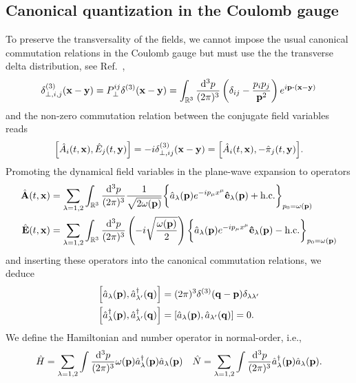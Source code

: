 \subsection{Canonical quantization in the Coulomb gauge}

To preserve the transversality of the fields, we cannot impose the usual canonical commutation relations in the Coulomb gauge but must use the the transverse delta distribution, see Ref.~\cite[p.~197]{Greiner2013},
\begin{equation}
	\delta_{\perp,i,j}^{(3)}(\vb{x}-\vb{y})
	=
	P^{ij}_\perp
	\delta^{(3)}(\vb{x}-\vb{y})
	=
	\int_{\mathbb{R}^3}
	\frac{\dd[3]{p}}{(2\pi)^3}
	\left(
		\delta_{ij}
		-
		\frac{p_ip_j}{\vb{p}^2}
	\right)
	e^{i\vb{p}\vdot(\vb{x}-\vb{y})}
\end{equation}
and the non-zero commutation relation between the conjugate field variables reads
\begin{equation}
	\comm{\hat{A}_i(t,\vb{x})}{\hat{E}_j(t,\vb{y})}
	=
	-i
	\delta_{\perp,ij}^{(3)}(\vb{x}-\vb{y})
	=
	\comm{\hat{A}_i(t,\vb{x})}{-\hat\pi_j(t,\vb{y})}
	.
\end{equation}
Promoting the dynamical field variables in the plane-wave expansion to operators
\begin{align}
	\hat{\vb{A}}(t,\vb{x})
	&=
	\sum_{\lambda=1,2}
	\int_{\mathbb{R}^3}
	\frac{\dd[3]{p}}{(2\pi)^3}
	\frac{1}{\sqrt{2\omega(\vb{p})}}
	\biggl\{
		\hat{a}_{\lambda}(\vb{p})
		e^{-ip_\mu x^\mu}
		\vu{e}_\lambda(\vb{p})
		+
		\text{h.c.}
	\biggr\}_{p_0=\omega(\vb{p})}
	\\
	\hat{\vb{E}}(t,\vb{x})
	&=
	\sum_{\lambda=1,2}
	\int_{\mathbb{R}^3}
	\frac{\dd[3]{p}}{(2\pi)^3}
	\left(
		-i
		\sqrt{\frac{\omega(\vb{p})}{2}}
	\right)
	\biggl\{
		\hat{a}_{\lambda}(\vb{p})
		e^{-ip_\mu x^\mu}
		\vu{e}_\lambda(\vb{p})
		-
		\text{h.c.}
	\biggr\}_{p_0=\omega(\vb{p})}
\end{align}
and inserting these operators into the canonical commutation relations, we deduce
\begin{align}
	\comm{\hat{a}_\lambda(\vb{p})}{\hat{a}_{\lambda^\prime}^\dagger(\vb{q})}
	&=
	(2\pi)^3
	\delta^{(3)}(\vb{q}-\vb{p})
	\delta_{\lambda\lambda^\prime}
	\\
	\comm{\hat{a}_\lambda^\dagger(\vb{p})}{\hat{a}_{\lambda^\prime}^\dagger(\vb{q})}
	&=
	\comm{\hat{a}_\lambda(\vb{p})}{\hat{a}_{\lambda^\prime}(\vb{q})}
	=
	0
	.
\end{align}
We define the Hamiltonian and number operator in normal-order, i.e.,
\begin{align}
	\hat{H}
	=
	\sum_{\lambda=1,2}
	\int\frac{\dd[3]{p}}{(2\pi)^3}
	\omega(\vb{p})
	\hat{a}_\lambda^\dagger(\vb{p})
	\hat{a}_\lambda(\vb{p})
	&&
	\hat{N}
	=
	\sum_{\lambda=1,2}
	\int\frac{\dd[3]{p}}{(2\pi)^3}
	\hat{a}_\lambda^\dagger(\vb{p})
	\hat{a}_\lambda(\vb{p})
	.
\end{align}